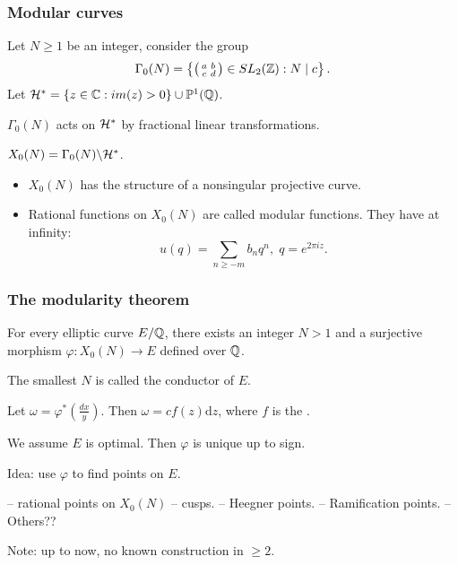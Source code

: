 \documentclass[handout]{beamer}
\begin{document}

\begin{frame}
\frametitle{Modular curves}
Let $N \geq 1$ be an integer, consider the group 
\[
	\Gamma_0(N) = \left \{ \left( \begin{smallmatrix}a&b\\c&d\end{smallmatrix}\right) \in SL_2(\mathbb{Z}): N \mid c \right\}.
\]
Let $\mathcal{H}^* = \{z \in \mathbb{C}: im(z) > 0\} \cup \mathbb{P}^1(\mathbb{Q})$.  

$\Gamma_0(N)$ acts on $\mathcal{H}^{*}$ by fractional linear transformations. 

\begin{Def}
$X_0(N) = \Gamma_0(N) \backslash \mathcal{H}^*$.
\end{Def}

\begin{itemize}
\item $X_0(N)$ has the structure of a  nonsingular projective curve.
\item Rational functions on $X_0(N)$ are called modular functions. They have  at infinity:
\[
	u(q)  = \sum_{n \geq -m} b_n q^n, \; q = e^{2 \pi i z}. 
\]
\end{itemize}
\end{frame}

\begin{frame}
\frametitle{The modularity theorem}


\begin{theorem}[Modularity]
For every elliptic curve $E/\mathbb{Q}$, there exists an integer $N > 1$ and a surjective morphism 
$\varphi: X_0(N) \to E$ defined over $\mathbb{Q}$.
\end{theorem}

\pause
\smallskip

The smallest $N$ is called the conductor of $E$.  \\
\smallskip

Let $\omega = \varphi^*(\frac{dx}{y})$. Then $\omega = c f(z) \mathrm{d} z$, where $f$ is the .  \\

\smallskip

We assume $E$ is optimal. Then $\varphi$ is unique up to sign.


Idea:  use $\varphi$ to find points on $E$. 

-- rational points on $X_0(N)$ -- cusps. 
-- Heegner points. 
-- Ramification points. 
-- Others?? 

Note: up to now, no known construction in $\geq 2$. 


\end{frame}
\end{document}

